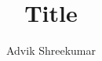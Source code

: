 \documentclass[11pt]{article}
\title{Title}
\author{Advik Shreekumar}
\begin{document}
\maketitle

\tableofcontents
\listoftodos

\newpage
\printbibliography
\end{document}
